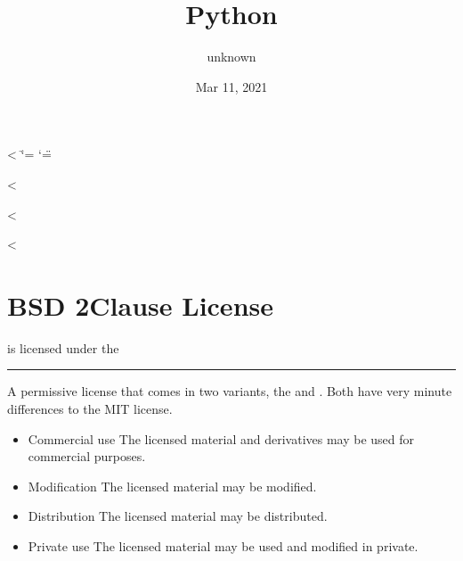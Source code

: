 \documentclass[letterpaper,10pt,english]{sphinxmanual}
\title{Python}
\date{Mar 11, 2021}
\author{unknown}
\begin{document}
<%
  \ifnum\catcode`\=\string=\active\shorthandoff{=}\fi
  \ifnum\catcode`\"=\active{}\fi
\fi

<%
\sphinxmaketitle
\pagestyle{plain}
\sphinxtableofcontents
\pagestyle{normal}
\label{\detokenize{index::doc}}


<%
\sphinxstepscope

<%
\chapter{BSD 2\sphinxhyphen{}Clause License}
\label{\detokenize{examples/bsd-2-clause:bsd-2-clause-license}}\label{\detokenize{examples/bsd-2-clause::doc}}
 is licensed under the 



\bigskip\hrule\bigskip



A permissive license that comes in two variants, the  and . Both have very minute differences to the MIT license.

\vspace{10px}

\begin{itemize}
\item {}
Commercial use \textendash{} The licensed material and derivatives may be used for commercial purposes.

\item {}
Modification \textendash{} The licensed material may be modified.

\item {}
Distribution \textendash{} The licensed material may be distributed.

\item {}
Private use \textendash{} The licensed material may be used and modified in private.

\end{itemize}

\vspace{10px}
\end{document}
